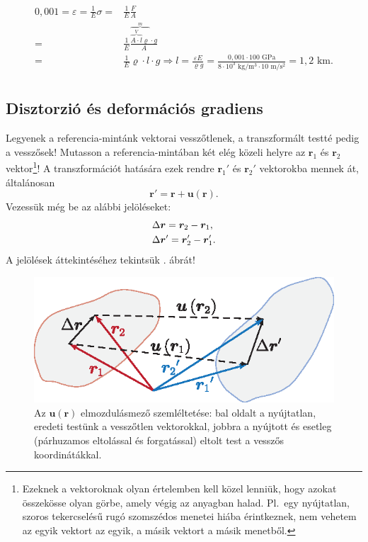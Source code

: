 \documentclass[12pt,a4paper]{scrartcl}
\let\mathbf\bm
\begin{document}
\[\begin{aligned}
  0{,}001 = \varepsilon  = \frac{1}{E}\sigma  =  & \frac{1}{E}\frac{F}{A} \\ 
   =  & \frac{1}{E}\frac{{\overbrace {\overbrace {A \cdot l}^V \varrho }^m \cdot g}}{A} \\ 
   =  & \frac{1}{E}\varrho  \cdot l \cdot g \Rightarrow l = \frac{{\varepsilon E}}{{\varrho g}} = \frac{{0,001 \cdot 100{\text{ GPa}}}}{{8 \cdot {{10}^3}{\text{ kg}}/{{\text{m}}^3} \cdot 10{\text{ m}}/{{\text{s}}^2}}} = 1{,}2{\text{ km.}} \\ 
\end{aligned} \]

\subsection{Disztorzió és deformációs gradiens}
Legyenek a referencia-mintánk vektorai vesszőtlenek, a transzformált testté pedig a vesszősek! Mutasson a referencia-mintában két elég közeli helyre az ${{\mathbf{r}}_1}$ és ${{\mathbf{r}}_2}$ vektor\footnote{Ezeknek a vektoroknak olyan értelemben kell közel lenniük, hogy azokat összekösse olyan görbe, amely végig az anyagban halad. Pl.\ egy nyújtatlan, szoros tekercselésű rugó szomszédos menetei hiába érintkeznek, nem vehetem az egyik vektort az egyik, a másik vektort a másik menetből.}! A transzformációt hatására ezek rendre ${\mathbf{r}}_1'$ és ${\mathbf{r}}_2'$ vektorokba mennek át, általánosan \[{\mathbf{r}}' = {\mathbf{r}} + {\mathbf{u}}\left( {\mathbf{r}} \right).\]
Vezessük még be az alábbi jelöléseket:
\[\begin{gathered}
  \Delta {\mathbf{r}} = {{\mathbf{r}}_2} - {{\mathbf{r}}_1}, \hfill \\
  \Delta {\mathbf{r}}' = {{\mathbf{r}}_2'} - {{\mathbf{r}}_1'}. \hfill \\ 
\end{gathered} \]
A jelölések áttekintéséhez tekintsük . ábrát!
\begin{figure}[htb] 
\centering    
\includegraphics[scale=1]{figs/u.eps}
\caption{Az ${\mathbf{u}}\left( {\mathbf{r}} \right)$ elmozdulásmező szemléltetése: bal oldalt a nyújtatlan, eredeti testünk a vesszőtlen vektorokkal, jobbra a nyújtott és esetleg (párhuzamos eltolással és forgatással) eltolt test a vesszős koordinátákkal.}
\label{fig:u}
\end{figure}
\FloatBarrier
\end{document}
